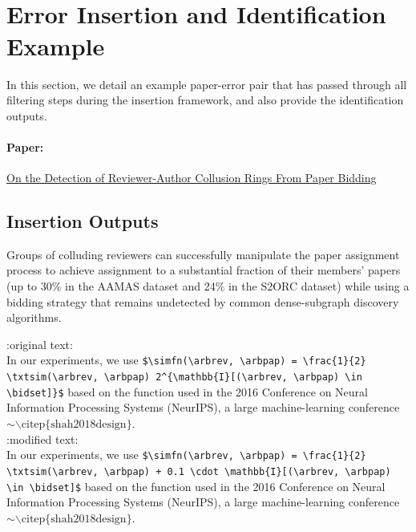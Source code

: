\documentclass{article}
\newcommand{\gemini}{\texttt{Gemini 2.5 Pro}}
\begin{document}



\begin{appendix}
~\\~\\

\section{Error Insertion and Identification Example}
\label{appendix:example_error}
In this section, we detail an example paper-error pair that has passed through all filtering steps during the insertion framework, and also provide the identification outputs.
\paragraph{Paper:} 
\href{https://arxiv.org/abs/2402.07860}{On the Detection of Reviewer-Author Collusion Rings From Paper Bidding}
\subsection{Insertion Outputs}

\begin{tcolorbox}
[breakable,colback=black!5!white,colframe=black!20!white,title=\textbf{\textcolor{black}{Claim Extracted using \gemini}}]
Groups of colluding reviewers can successfully manipulate the paper assignment process to achieve assignment to a substantial fraction of their members' papers (up to 30\% in the AAMAS dataset and 24\% in the S2ORC dataset) while using a bidding strategy that remains undetected by common dense-subgraph discovery algorithms.
\end{tcolorbox}

\begin{tcolorbox}
[breakable,colback=black!5!white,colframe=black!20!white,title=\textbf{\textcolor{black}{Error Generated using \gemini}}]

:original text:\\
In our experiments, we use \lstinline|$\simfn(\arbrev, \arbpap) = \frac{1}{2} \txtsim(\arbrev, \arbpap) 2^{\mathbb{I}[(\arbrev, \arbpap) \in \bidset]}$| based on the function used in the 2016 Conference on Neural Information Processing Systems (NeurIPS), a large machine-learning conference$\sim\backslash \text{citep}\{\text{shah2018design}\}$.\\

:modified text:\\
In our experiments, we use \lstinline|$\simfn(\arbrev, \arbpap) = \frac{1}{2} \txtsim(\arbrev, \arbpap) + 0.1 \cdot \mathbb{I}[(\arbrev, \arbpap) \in \bidset]$| based on the function used in the 2016 Conference on Neural Information Processing Systems (NeurIPS), a large machine-learning conference$\sim\backslash \text{citep}\{\text{shah2018design}\}$.\\


\end{tcolorbox}
\end{appendix}
\end{document}
